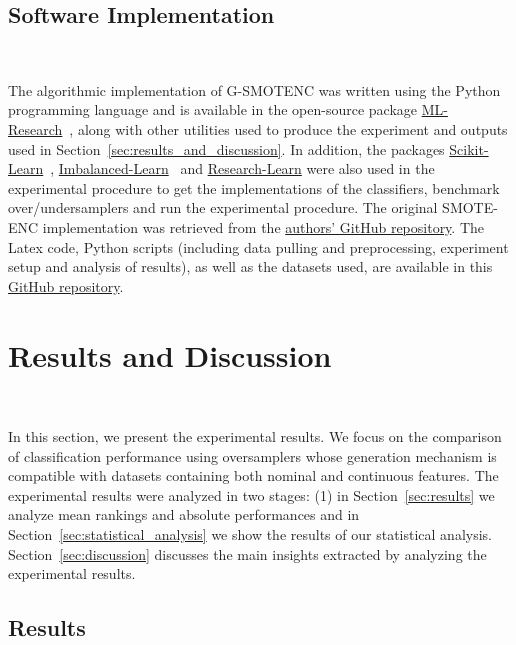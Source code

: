 \documentclass[preprint,12pt]{elsarticle}
\begin{document}
{\subsection{Software Implementation}~\label{sec:software_implementation}

The algorithmic implementation of G-SMOTENC was written using the Python
programming language and is available in the open-source package
\href{https://github.com/joaopfonseca/ml-research}{ML-Research}~\cite{fonseca2021increasing},
along with other utilities used to produce the experiment and outputs used in
Section~\ref{sec:results_and_discussion}. In addition, the packages
\href{https://github.com/scikit-learn/scikit-learn/}{Scikit-Learn}~\cite{scikit-learn},
\href{https://github.com/scikit-learn-contrib/imbalanced-learn}{Imbalanced-Learn}~\cite{JMLR:v18:16-365}
and \href{https://github.com/georgedouzas/research-learn/}{Research-Learn}
were also used in the experimental procedure to get the implementations of the
classifiers, benchmark over/undersamplers and run the experimental procedure.
The original SMOTE-ENC implementation was retrieved from the
\href{https://github.com/Mimimkh/SMOTE-ENC-code}{authors' GitHub repository}.
The Latex code, Python scripts (including data pulling and preprocessing,
experiment setup and analysis of results), as well as the datasets used, are
available in this \href{https://github.com/joaopfonseca/publications}{GitHub
repository}.
 
\section{Results and Discussion}~\label{sec:results_and_discussion}

In this section, we present the experimental results. We focus on the
comparison of classification performance using oversamplers whose generation
mechanism is compatible with datasets containing both nominal and continuous
features. The experimental results were analyzed in two stages: (1) in
Section~\ref{sec:results} we analyze mean rankings and absolute performances
and in Section~\ref{sec:statistical_analysis} we show the results of our
statistical analysis. Section~\ref{sec:discussion} discusses the main
insights extracted by analyzing the experimental results.

\subsection{Results}~\label{sec:results}

}
\end{document}
